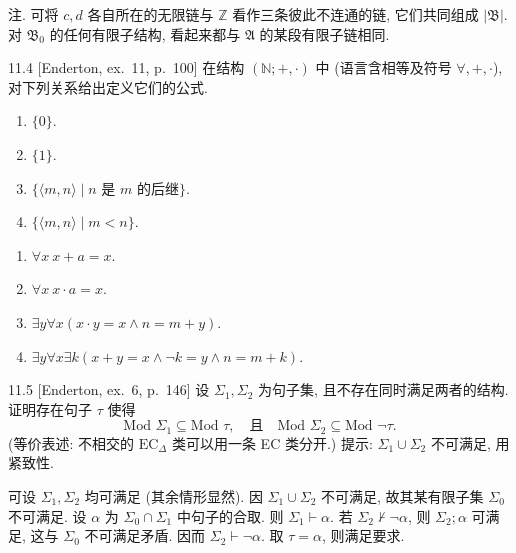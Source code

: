 注. 可将 $c,d$ 各自所在的无限链与 $\mathbb{Z}$ 看作三条彼此不连通的链, 它们共同组成 $|\mathfrak{B}|$. 对 $\mathfrak{B}_0$ 的任何有限子结构, 看起来都与 $\mathfrak{A}$ 的某段有限子链相同.

\begin{exercise}{11.4}
  [Enderton, ex.~11, p.~100]
  在结构 $(\mathbb{N}; +,\cdot)$ 中 (语言含相等及符号 $\forall,+,\cdot$), 对下列关系给出定义它们的公式.
  \begin{enumerate}
    \item $\{0\}$.
    \item $\{1\}$.
    \item $\{\langle m,n\rangle\mid n\text{ 是 } m\text{ 的后继}\}$.
    \item $\{\langle m,n\rangle\mid m<n\}$.\qedhere
  \end{enumerate}
\end{exercise}

\begin{enumerate}
  \item $\forall x\ x+a=x$.
  \item $\forall x\ x\cdot a=x$.
  \item $\exists y\forall x(x\cdot y=x\wedge n=m+y)$.
  \item $\exists y\forall x\exists k(x+y=x\wedge \neg k=y\wedge n=m+k)$.
\end{enumerate}

\begin{exercise}{11.5}
  [Enderton, ex.~6, p.~146]
  设 $\Sigma_1,\Sigma_2$ 为句子集, 且不存在同时满足两者的结构. 证明存在句子 $\tau$ 使得
  \[
    \text{Mod }\Sigma_1\subseteq\text{Mod }\tau,\quad \text{且}\quad \text{Mod }\Sigma_2\subseteq\text{Mod }\lnot\tau.
  \]
  (等价表述: 不相交的 $\text{EC}_\Delta$ 类可以用一条 EC 类分开.) 提示: $\Sigma_1\cup\Sigma_2$ 不可满足, 用紧致性.
\end{exercise}

可设 $\Sigma_1,\Sigma_2$ 均可满足 (其余情形显然). 因 $\Sigma_1\cup\Sigma_2$ 不可满足, 故其某有限子集 $\Sigma_0$ 不可满足. 设 $\alpha$ 为 $\Sigma_0\cap\Sigma_1$ 中句子的合取. 则 $\Sigma_1\vdash\alpha$. 若 $\Sigma_2\not\vdash\neg\alpha$, 则 $\Sigma_2;\alpha$ 可满足, 这与 $\Sigma_0$ 不可满足矛盾. 因而 $\Sigma_2\vdash\neg\alpha$. 取 $\tau=\alpha$, 则满足要求.
